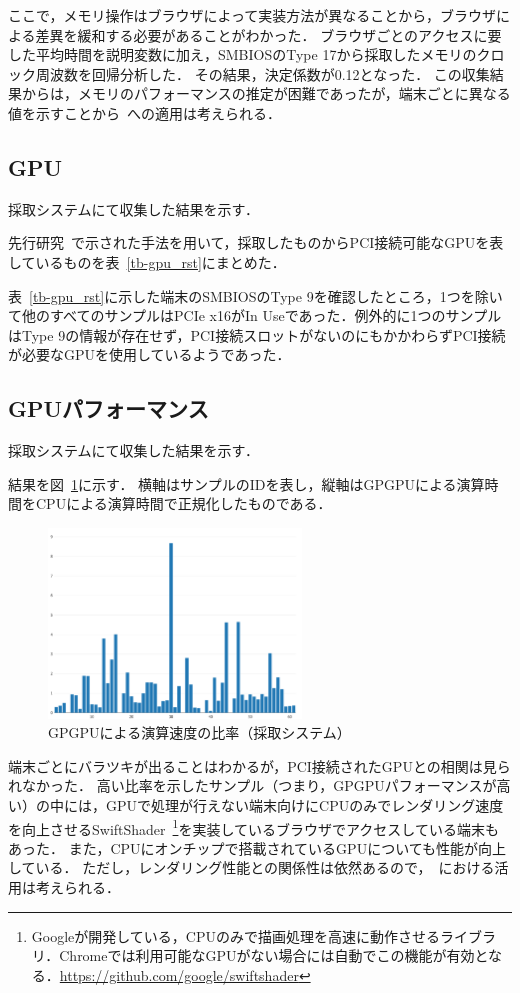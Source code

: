 ここで，メモリ操作はブラウザによって実装方法が異なることから，ブラウザによる差異を緩和する必要があることがわかった．
ブラウザごとのアクセスに要した平均時間を説明変数に加え，SMBIOSのType 17から採取したメモリのクロック周波数を回帰分析した．
その結果，決定係数が0.12となった．
この収集結果からは，メモリのパフォーマンスの推定が困難であったが，端末ごとに異なる値を示すことから\fp~への適用は考えられる．

\subsection{GPU}
採取システムにて収集した結果を示す．

先行研究~\cite{mowery2012pixel}で示された手法を用いて，採取したものからPCI接続可能なGPUを表しているものを表~\ref{tb-gpu_rst}にまとめた．



表~\ref{tb-gpu_rst}に示した端末のSMBIOSのType 9を確認したところ，1つを除いて他のすべてのサンプルはPCIe x16がIn Useであった．例外的に1つのサンプルはType 9の情報が存在せず，PCI接続スロットがないのにもかかわらずPCI接続が必要なGPUを使用しているようであった．

\subsection{GPUパフォーマンス}
採取システムにて収集した結果を示す．

結果を図~\ref{fig-gpgpu_rst}に示す．
横軸はサンプルのIDを表し，縦軸はGPGPUによる演算時間をCPUによる演算時間で正規化したものである．

\begin{figure}[H]
    \centering
    \includegraphics[width=0.6\textwidth,pagebox=cropbox]{fig/gpgpu_rst.pdf}
    \caption{GPGPUによる演算速度の比率（採取システム）}
    \label{fig-gpgpu_rst}
\end{figure}

端末ごとにバラツキが出ることはわかるが，PCI接続されたGPUとの相関は見られなかった．
高い比率を示したサンプル（つまり，GPGPUパフォーマンスが高い）の中には，GPUで処理が行えない端末向けにCPUのみでレンダリング速度を向上させるSwiftShader~\footnote{Googleが開発している，CPUのみで描画処理を高速に動作させるライブラリ．Chromeでは利用可能なGPUがない場合には自動でこの機能が有効となる．\url{https://github.com/google/swiftshader}}を実装しているブラウザでアクセスしている端末もあった．
また，CPUにオンチップで搭載されているGPUについても性能が向上している．
ただし，レンダリング性能との関係性は依然あるので，\fp~における活用は考えられる．
